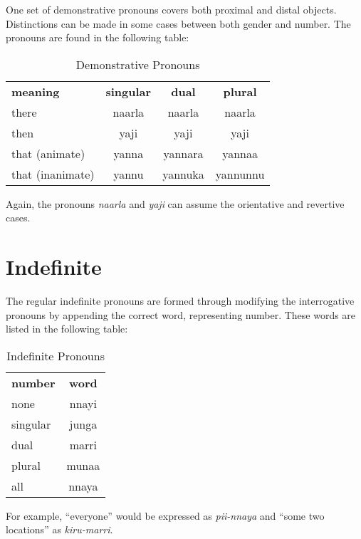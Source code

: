One set of demonstrative pronouns covers both proximal and distal objects.
Distinctions can be made in some cases between both gender and number. The
pronouns are found in the following table:

\begin{table}[h]
\centering
\begin{tabular}{lccc}
 \textbf{meaning} & \textbf{singular} & \textbf{dual} & \textbf{plural}\\
 there & naarla & naarla & naarla\\
 then & yaji & yaji & yaji\\
 that (animate) & yanna & yannara & yannaa\\
 that (inanimate) & yannu & yannuka & yannunnu\\
\end{tabular}
\caption{Demonstrative Pronouns}
\end{table}

Again, the pronouns \textit{naarla} and \textit{yaji} can assume the orientative
and revertive cases.

\section{Indefinite}

The regular indefinite pronouns are formed through modifying the interrogative
pronouns by appending the correct word, representing number. These words are
listed in the following table:

\begin{table}[h]
\centering
\begin{tabular}{lc}
 \textbf{number} & \textbf{word}\\
 none & nnayi\\
 singular & junga\\
 dual & marri\\
 plural & munaa\\
 all & nnaya\\
\end{tabular}
\caption{Indefinite Pronouns}
\end{table}

For example, ``everyone'' would be expressed as \textit{pii-nnaya} and ``some
two locations'' as \textit{kiru-marri}.
